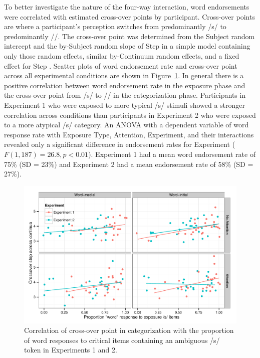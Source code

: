 To better investigate the nature of the four-way interaction, word endorsements were correlated with estimated cross-over points by participant.  
Cross-over points are where a participant's perception switches from predominantly /s/ to predominantly /\textesh/.
The cross-over point was determined from the Subject random intercept and the by-Subject random slope of Step in a simple model containing only those random effects, similar by-Continuum random effects, and a fixed effect for Step \citep{Kleber2012}. 
Scatter plots of word endorsement rate and cross-over point across all experimental conditions are shown in Figure~\ref{fig:exp12xover}.
In general there is a positive correlation between word endorsement rate in the exposure phase and the cross-over point from /s/ to /\textesh/ in the categorization phase.
Participants in Experiment 1 who were exposed to more typical /s/ stimuli showed a stronger correlation across conditions than participants in Experiment 2 who were exposed to a more atypical /s/ category.
An ANOVA with a dependent variable of word response rate with Exposure Type, Attention, Experiment, and their interactions revealed only a significant difference in endorsement rates for Experiment ($F(1, 187) = 26.8, p < 0.01$).  
Experiment 1 had a mean word endorsement rate of 75\% (SD = 23\%) and Experiment 2 had a mean endorsement rate of 58\% (SD = 27\%).

\begin{figure}[!ht]
\caption{Correlation of cross-over point in categorization with the proportion of word responses to critical items containing an ambiguous /s/ token in Experiments 1 and 2.}\label{fig:exp12xover}
\begin{center}
\includegraphics[width=\textwidth]{graphs/exp12_xoverwordresp}
\end{center}
\end{figure} 

